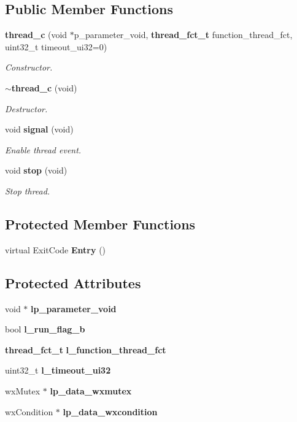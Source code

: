\subsection*{Public Member Functions}
\begin{DoxyCompactItemize}
\item 
\textbf{ thread\+\_\+c} (void $\ast$p\+\_\+parameter\+\_\+void, \textbf{ thread\+\_\+fct\+\_\+t} function\+\_\+thread\+\_\+fct, uint32\+\_\+t timeout\+\_\+ui32=0)
\begin{DoxyCompactList}\small\item\em Constructor. \end{DoxyCompactList}\item 
\textbf{ $\sim$thread\+\_\+c} (void)
\begin{DoxyCompactList}\small\item\em Destructor. \end{DoxyCompactList}\item 
void \textbf{ signal} (void)
\begin{DoxyCompactList}\small\item\em Enable thread event. \end{DoxyCompactList}\item 
void \textbf{ stop} (void)
\begin{DoxyCompactList}\small\item\em Stop thread. \end{DoxyCompactList}\end{DoxyCompactItemize}
\subsection*{Protected Member Functions}
\begin{DoxyCompactItemize}
\item 
virtual Exit\+Code \textbf{ Entry} ()
\end{DoxyCompactItemize}
\subsection*{Protected Attributes}
\begin{DoxyCompactItemize}
\item 
\mbox{\label{classthread__c_a8e6f272359419050d1206ebb3ed95c72}} 
void $\ast$ {\bfseries lp\+\_\+parameter\+\_\+void}
\item 
\mbox{\label{classthread__c_a7e7bcb3a3dfdd832b38be0b355b27b98}} 
bool {\bfseries l\+\_\+run\+\_\+flag\+\_\+b}
\item 
\mbox{\label{classthread__c_a4ac2959f1ff58e068a99502d30ddaa83}} 
\textbf{ thread\+\_\+fct\+\_\+t} {\bfseries l\+\_\+function\+\_\+thread\+\_\+fct}
\item 
\mbox{\label{classthread__c_a808704f4a2c76d4cf0ed89f21372c08e}} 
uint32\+\_\+t {\bfseries l\+\_\+timeout\+\_\+ui32}
\item 
\mbox{\label{classthread__c_a80ef03d2adab2dd63a03dbbbc68bc8e1}} 
wx\+Mutex $\ast$ {\bfseries lp\+\_\+data\+\_\+wxmutex}
\item 
\mbox{\label{classthread__c_a593798345426a5b70aefcf6322675ee2}} 
wx\+Condition $\ast$ {\bfseries lp\+\_\+data\+\_\+wxcondition}
\end{DoxyCompactItemize}


